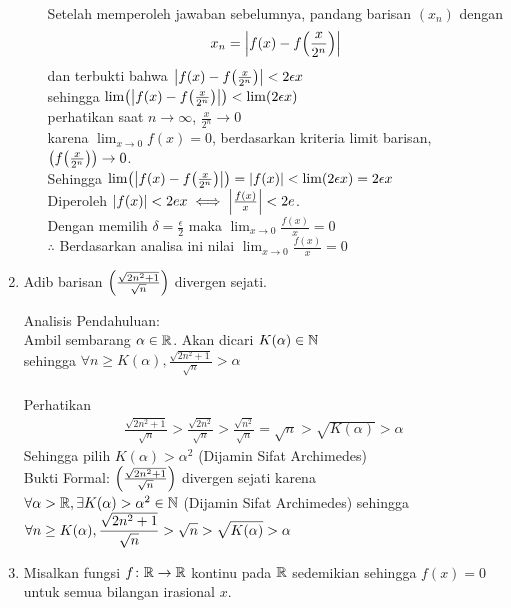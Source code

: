 \documentclass{article}
\begin{document}
\begin{enumerate}[leftmargin=*, label={\arabic*}.]
\begin{enumerate}
    \\Setelah memperoleh jawaban sebelumnya, pandang barisan $(x_n)$ dengan
    \[
        x_n = \abs*{f(x)-f\oio*{\frac{x}{2^n}}}
    \]
    dan terbukti bahwa $\abs*{f(x)-f\oio*{\frac{x}{2^n}}} < 2\epsilon x$\\
    sehingga $\lim\oio*{\abs*{f(x)-f\oio*{\frac{x}{2^n}}}} < \lim\oio*{2\epsilon x}$\\
    perhatikan saat $n \to \infty$, $\frac{x}{2^n} \to 0$\\
    karena $\lim_{x\to 0} f(x)=0$,
    berdasarkan kriteria limit barisan, $\oio*{f\oio*{\frac{x}{2^n}}} \to 0$.\\
    Sehingga $\lim\oio*{\abs*{f(x)-f\oio*{\frac{x}{2^n}}}} = |f(x)| < \lim\oio*{2\epsilon x} = 2\epsilon x$\\
    Diperoleh $|f(x)| < 2ex \iff \abs*{\frac{f(x)}{x}} < 2e$.\\
    Dengan memilih $\delta = \frac{\epsilon}{2}$ maka $\lim_{x\to 0}\frac{f(x)}{x}=0$\\
    $\therefore$ Berdasarkan analisa ini nilai $\lim_{x\to 0}\frac{f(x)}{x}=0$
\end{enumerate}
\item Adib barisan $\oio*{\frac{\sqrt{2n^2+1}}{\sqrt{n}}}$ divergen sejati.

Analisis Pendahuluan:\\
Ambil sembarang $\alpha \in \R$. Akan dicari $K(\alpha)\in \N$ \\
sehingga $\forall n \geq K(\alpha), \frac{\sqrt{2n^2+1}}{\sqrt{n}} > \alpha$\\
\\Perhatikan
\begin{align*}
    \frac{\sqrt{2n^2+1}}{\sqrt{n}} > \frac{\sqrt{2n^2}}{\sqrt{n}} > \frac{\sqrt{n^2}}{\sqrt{n}} = \sqrt{n} > \sqrt{K(\alpha)} > \alpha
\end{align*}
Sehingga pilih $K(\alpha) > \alpha^2$ (Dijamin Sifat Archimedes)
\\Bukti Formal: $\oio*{\frac{\sqrt{2n^2+1}}{\sqrt{n}}}$ divergen sejati karena \\
$\forall \alpha > \R, \exists K(\alpha) > \alpha^2 \in \N$ (Dijamin Sifat Archimedes) sehingga
\\$\forall n \geq K(\alpha), \ds \frac{\sqrt{2n^2+1}}{\sqrt{n}} > \sqrt{n} > \sqrt{K(\alpha)} > \alpha$

\item Misalkan fungsi $f\colon \R \to \R$ kontinu pada $\R$ sedemikian sehingga $f(x)=0$ untuk
semua bilangan irasional $x$.


\end{enumerate}
\end{document}

